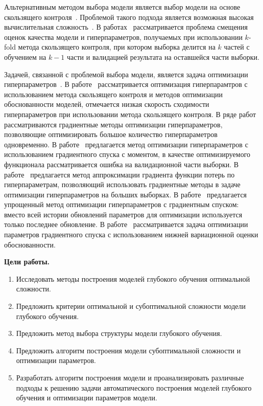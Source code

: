 Альтернативным методом выбора модели является выбор модели на основе скользящего контроля~\cite{cv_ms, tokmakova}. Проблемой такого подхода является возможная высокая вычислительная сложность~\cite{expensive, expensive2}. В работах~\cite{bias,bias2} рассматривается проблема смещения оценок качества модели и гиперпараметров, получаемых при использовании $k$-fold метода скользящего контроля, при котором выборка делится на $k$ частей с обучением на $k-1$ части и валидацией результата на оставшейся части выборки. 

Задачей, связанной с проблемой выбора модели, является задача оптимизации гиперпараметров~\cite{mackay,bishop}. В работе~\cite{tokmakova} рассматривается оптимизация гиперпарамтров с использованием метода скользящего контроля и методов оптимизации обоснованности моделей, отмечается низкая скорость сходимости гиперпараметров при использовании метода скользящего контроля. В ряде работ~\cite{hyper, hyper2} рассматриваются градиентные методы оптимизации гиперпараметров, позволяющие оптимизировать большое количество гиперпараметров одновременно. В работе~\cite{hyper} предлагается метод оптимизации гиперпараметров с использованием градиентного спуска с моментом, в качестве оптимизируемого функционала рассматривается ошибка на валидационной части выборки. В работе~\cite{approx_hyper} предлагается метод аппроксимации градиента функции потерь по гиперпараметрам, позволяющий использовать градиентные методы в задаче оптимизации гиперпараметров на больших выборках. В работе~\cite{greed_hyper} предлагается упрощенный метод оптимизации гиперпараметров с градиентным спуском: вместо всей истории обновлений параметров для оптимизации используется только последнее обновление. В работе~\cite{sgd_cont} рассматривается задача оптимизации параметров градиентного спуска с использованием нижней вариационной оценки обоснованности. 


\vspace{0.5cm}
\textbf{Цели работы.}
\vspace{0.2cm}
\begin{enumerate}
\item Исследовать методы построения моделей глубокого обучения оптимальной сложности.
\item Предложить критерии оптимальной и субоптимальной сложности модели глубокого обучения.
\item Предложить метод выбора структуры модели глубокого обучения.
\item Предложить алгоритм построения модели субоптимальной сложности и оптимизации параметров.
\item Разработать алгоритм построения модели и проанализировать различные подходы к решению задачи автоматического построения моделей глубокого обучения и оптимизации параметров модели.
\end{enumerate}


